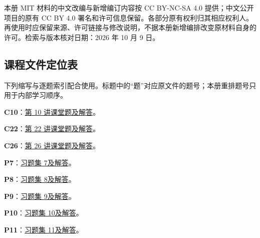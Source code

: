 \documentclass[12pt,fontset=fandol]{ctexart}
\begin{document}
本册 MIT 材料的中文改编与新增编订内容按 CC BY-NC-SA 4.0 提供；中文公开项目的原有 CC BY 4.0 署名和许可信息保留。各部分原有权利归其相应权利人。再使用时应保留来源、许可链接与修改说明，不据本册新增编排改变原材料自身的许可。检索与版本核对日期：2026 年 10 月 9 日。

\subsection*{课程文件定位表}
下列缩写与逐题索引配合使用。标题中的“题”对应原文件的题号；本册重排题号只用于内部学习顺序。


\noindent\textbf{C10}：\href{https://ocw.mit.edu/courses/18-05-introduction-to-probability-and-statistics-spring-2022/mit18_05_s22_class10_pset_sol.pdf}{第 10 讲课堂题及解答}。\par

\noindent\textbf{C22}：\href{https://ocw.mit.edu/courses/18-05-introduction-to-probability-and-statistics-spring-2022/mit18_05_s22_class22_pset_sol.pdf}{第 22 讲课堂题及解答}。\par

\noindent\textbf{C26}：\href{https://ocw.mit.edu/courses/18-05-introduction-to-probability-and-statistics-spring-2022/mit18_05_s22_class26_pset_sol.pdf}{第 26 讲课堂题及解答}。\par

\noindent\textbf{P7}：\href{https://ocw.mit.edu/courses/18-05-introduction-to-probability-and-statistics-spring-2022/mit18_05_s22_pset07_sol.pdf}{习题集 7及解答}。\par

\noindent\textbf{P8}：\href{https://ocw.mit.edu/courses/18-05-introduction-to-probability-and-statistics-spring-2022/mit18_05_s22_pset08_sol.pdf}{习题集 8及解答}。\par

\noindent\textbf{P9}：\href{https://ocw.mit.edu/courses/18-05-introduction-to-probability-and-statistics-spring-2022/mit18_05_s22_pset09_sol.pdf}{习题集 9及解答}。\par

\noindent\textbf{P10}：\href{https://ocw.mit.edu/courses/18-05-introduction-to-probability-and-statistics-spring-2022/mit18_05_s22_pset10_sol.pdf}{习题集 10及解答}。\par

\noindent\textbf{P11}：\href{https://ocw.mit.edu/courses/18-05-introduction-to-probability-and-statistics-spring-2022/mit18_05_s22_pset11_sol.pdf}{习题集 11及解答}。\par
\end{document}
